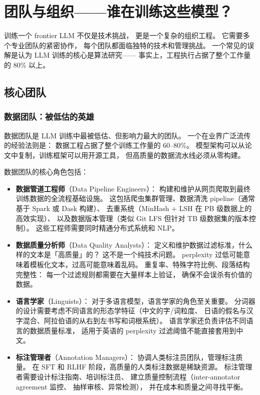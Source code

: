 \chapter{团队与组织——谁在训练这些模型？}
\label{ch:org}

训练一个 frontier LLM 不仅是技术挑战，
更是一个复杂的组织工程。
它需要多个专业团队的紧密协作，
每个团队都面临独特的技术和管理挑战。
一个常见的误解是认为 LLM 训练的核心是算法研究——
事实上，工程执行占据了整个工作量的 80\% 以上。

\section{核心团队}

\subsection{数据团队：被低估的英雄}

数据团队是 LLM 训练中最被低估、但影响力最大的团队。
一个在业界广泛流传的经验法则是：
数据工程占据了整个训练工作量的 60--80\%。
模型架构可以从论文中复制，训练框架可以用开源工具，
但高质量的数据流水线必须从零构建。

数据团队的核心角色包括：

\begin{itemize}[noitemsep]
  \item \textbf{数据管道工程师}（Data Pipeline Engineers）：
        构建和维护从网页爬取到最终训练数据的全流程基础设施。
        这包括爬虫集群管理、数据清洗 pipeline（通常基于 Spark 或 Dask 构建）、
        去重系统（MinHash + LSH 在 PB 级数据上的高效实现）、
        以及数据版本管理（类似 Git LFS 但针对 TB 级数据集的版本控制）。
        这些工程师需要同时精通分布式系统和 NLP。
  \item \textbf{数据质量分析师}（Data Quality Analysts）：
        定义和维护数据过滤标准，什么样的文本是「高质量」的？
        这不是一个纯技术问题。
        perplexity 过低可能意味着模板化文本，过高可能意味着乱码。
        重复率、特殊字符比例、段落结构完整性：
        每一个过滤规则都需要在大量样本上验证，
        确保不会误杀有价值的数据。
  \item \textbf{语言学家}（Linguists）：
        对于多语言模型，语言学家的角色至关重要。
        分词器的设计需要考虑不同语言的形态学特征（中文的字/词粒度、
        日语的假名与汉字混合、阿拉伯语的从右到左书写和词根系统）。
        语言学家还负责评估不同语言的数据质量标准，
        适用于英语的 perplexity 过滤阈值不能直接套用到中文。
  \item \textbf{标注管理者}（Annotation Managers）：
        协调人类标注员团队，管理标注质量。
        在 SFT 和 RLHF 阶段，高质量的人类标注数据是稀缺资源。
        标注管理者需要设计标注指南、培训标注员、
        建立质量控制流程（inter-annotator agreement 监控、
        抽样审核、异常检测），
        并在成本和质量之间寻找平衡。
\end{itemize}

